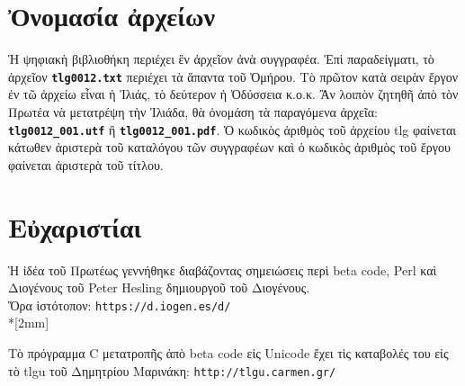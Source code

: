 \documentclass[12pt,a4paper]{article}
\begin{document}
\section{Ὀνομασία ἀρχείων}
    Ἡ ψηφιακὴ βιβλιοθήκη περιέχει ἓν ἀρχεῖον ἀνὰ συγγραφέα.
    Ἐπὶ παραδείγματι, τὸ ἀρχεῖον {\bf\tt tlg0012.txt}
    περιέχει τὰ ἅπαντα τοῦ Ὁμήρου.
    Τὸ πρῶτον κατὰ σειρὰν ἔργον ἐν τῶ ἀρχείω εἶναι ἡ Ἰλιάς,
    τὸ δεύτερον ἡ Ὀδύσσεια κ.ο.κ.
    Ἂν λοιπὸν ζητηθῆ ἀπὸ τὸν Πρωτέα νὰ μετατρέψη τὴν Ἰλιάδα,
    θὰ ὀνομάση τὰ παραγόμενα  ἀρχεῖα:
    {\bf {\tt tlg0012\_001.utf}} ἢ {\bf{\tt tlg0012\_001.pdf}}.
    Ὁ κωδικὸς ἀριθμὸς τοῦ ἀρχείου tlg φαίνεται κάτωθεν ἀριστερὰ
    τοῦ καταλόγου τῶν συγγραφέων καὶ ὁ κωδικὸς ἀριθμὸς τοῦ
    ἔργου φαίνεται ἀριστερὰ τοῦ τίτλου.
\section{Εὐχαριστίαι}
    Ἡ ἰδέα τοῦ Πρωτέως γεννήθηκε διαβάζοντας σημειώσεις περὶ beta code,
    Perl καὶ Διογένους τοῦ Peter Hesling δημιουργοῦ
    τοῦ Διογένους.\\
    Ὅρα ἱστότοπον:
    {\tt https://d.iogen.es/d/ }\\*[2mm]

    Τὸ πρόγραμμα C μετατροπῆς ἀπὸ beta code εἰς Unicode
    ἔχει τὶς καταβολές του εἰς τὸ tlgu τοῦ Δημητρίου Μαρινάκη:
    {\tt http://tlgu.carmen.gr/}
\end{document}
